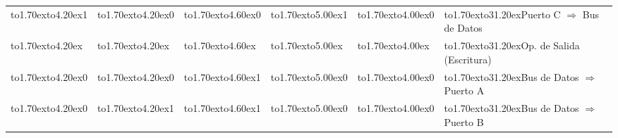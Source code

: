 \begin{table}[!htb]
\begin{tabular}{|l|l|l|l|l|l|}
\cline{1-6}
\vbox to1.70ex{\vspace{1pt}\vfil\hbox to4.20ex{\hfil 1\hfil}\vfil} & 
\vbox to1.70ex{\vspace{1pt}\vfil\hbox to4.20ex{\hfil 0\hfil}\vfil} & 
\vbox to1.70ex{\vspace{1pt}\vfil\hbox to4.60ex{\hfil 0\hfil}\vfil} & 
\vbox to1.70ex{\vspace{1pt}\vfil\hbox to5.00ex{\hfil 1\hfil}\vfil} & 
\vbox to1.70ex{\vspace{1pt}\vfil\hbox to4.00ex{\hfil 0\hfil}\vfil} & 
\vbox to1.70ex{\vspace{1pt}\vfil\hbox to31.20ex{\hfil Puerto C $\Longrightarrow$ Bus %
de Datos\hfil}\vfil} \\

\cline{1-6}
\vbox to1.70ex{\vspace{1pt}\vfil\hbox to4.20ex{\hfil \hfil}\vfil} & 
\vbox to1.70ex{\vspace{1pt}\vfil\hbox to4.20ex{\hfil \hfil}\vfil} & 
\vbox to1.70ex{\vspace{1pt}\vfil\hbox to4.60ex{\hfil \hfil}\vfil} & 
\vbox to1.70ex{\vspace{1pt}\vfil\hbox to5.00ex{\hfil \hfil}\vfil} & 
\vbox to1.70ex{\vspace{1pt}\vfil\hbox to4.00ex{\hfil \hfil}\vfil} & 
\vbox to1.70ex{\vspace{1pt}\vfil\hbox to31.20ex{\hfil Op. de Salida %
(Escritura)\hfil}\vfil} \\

\cline{1-6}
\vbox to1.70ex{\vspace{1pt}\vfil\hbox to4.20ex{\hfil 0\hfil}\vfil} & 
\vbox to1.70ex{\vspace{1pt}\vfil\hbox to4.20ex{\hfil 0\hfil}\vfil} & 
\vbox to1.70ex{\vspace{1pt}\vfil\hbox to4.60ex{\hfil 1\hfil}\vfil} & 
\vbox to1.70ex{\vspace{1pt}\vfil\hbox to5.00ex{\hfil 0\hfil}\vfil} & 
\vbox to1.70ex{\vspace{1pt}\vfil\hbox to4.00ex{\hfil 0\hfil}\vfil} & 
\vbox to1.70ex{\vspace{1pt}\vfil\hbox to31.20ex{\hfil Bus de Datos $\Longrightarrow$ %
Puerto A\hfil}\vfil} \\

\cline{1-6}
\vbox to1.70ex{\vspace{1pt}\vfil\hbox to4.20ex{\hfil 0\hfil}\vfil} & 
\vbox to1.70ex{\vspace{1pt}\vfil\hbox to4.20ex{\hfil 1\hfil}\vfil} & 
\vbox to1.70ex{\vspace{1pt}\vfil\hbox to4.60ex{\hfil 1\hfil}\vfil} & 
\vbox to1.70ex{\vspace{1pt}\vfil\hbox to5.00ex{\hfil 0\hfil}\vfil} & 
\vbox to1.70ex{\vspace{1pt}\vfil\hbox to4.00ex{\hfil 0\hfil}\vfil} & 
\vbox to1.70ex{\vspace{1pt}\vfil\hbox to31.20ex{\hfil Bus de Datos $\Longrightarrow$ %
Puerto B\hfil}\vfil} \\


\end{tabular}
\end{table}
